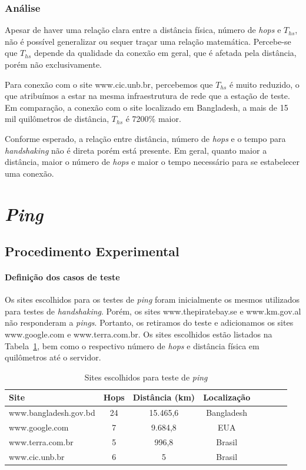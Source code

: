 \documentclass[12pt,a4paper]{report}
\begin{document}
\subsubsection*{Análise}

Apesar de haver uma relação clara entre a distância física, número de \textit{hops} e \(T_{hs}\), não é possível generalizar ou sequer traçar uma relação matemática. Percebe-se que \(T_{hs}\) depende da qualidade da conexão em geral, que é afetada pela distância, porém não exclusivamente.

Para conexão com o site www.cic.unb.br, percebemos que \(T_{hs}\) é muito reduzido, o que atribuímos a estar na mesma infraestrutura de rede que a estação de teste. Em comparação, a conexão com o site localizado em Bangladesh, a mais de 15 mil quilômetros de distância, \(T_{hs}\) é 7200\% maior.

Conforme esperado, a relação entre distância, número de \textit{hops} e o tempo para \textit{handshaking} não é direta porém está presente. Em geral, quanto maior a distância, maior o número de \textit{hops} e maior o tempo necessário para se estabelecer uma conexão.

\section{\textit{Ping}}

\subsection{Procedimento Experimental}

\paragraph{Definição dos casos de teste} Os sites escolhidos para os testes de \textit{ping} foram inicialmente os mesmos utilizados para testes de \textit{handshaking}. Porém, os sites www.thepiratebay.se e www.km.gov.al não responderam a \textit{pings}. Portanto, os retiramos do teste e adicionamos os sites www.google.com e www.terra.com.br. Os sites escolhidos estão listados na Tabela~\ref{tab:sitesping}, bem como o respectivo número de \textit{hops} e distância física em quilômetros até o servidor.

\begin{table}[h]
	\center
	\begin{tabular}{l*{6}{c}r}
	Site						& Hops	& Distância (km)	& Localização\\
	\hline
	www.bangladesh.gov.bd		& 24		& 15.465,6		& Bangladesh\\
	www.google.com			& 7		& 9.684,8			& EUA\\
	www.terra.com.br			& 5		& 996,8			& Brasil\\
	www.cic.unb.br				& 6		& 5				& Brasil\\
	\end{tabular}
	\caption{Sites escolhidos para teste de \textit{ping}}
	\label{tab:sitesping}
\end{table}
\end{document}
